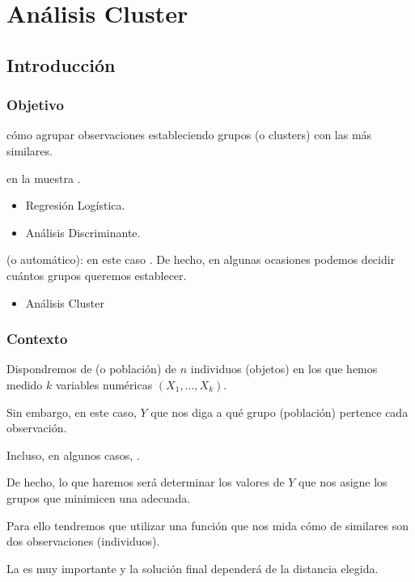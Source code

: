 \section{Análisis Cluster}
\subsection{Introducción}
\subsubsection{Objetivo}
 cómo agrupar observaciones estableciendo grupos (o clusters) con las más similares.

 en la muestra .
\begin{itemize}
\item Regresión Logística.
\item Análisis Discriminante.
\end{itemize}
 (o automático): en este caso . De hecho, en algunas ocasiones podemos decidir cuántos grupos queremos establecer.
\begin{itemize}
\item Análisis Cluster
\end{itemize}
\subsubsection{Contexto}
Dispondremos de  (o población) de $n$ individuos (objetos) en los que hemos medido $k$ variables numéricas $(X_1,\dots,X_k)$.

Sin embargo, en este caso,  $Y$ que nos diga a qué grupo (población) pertence cada observación.

Incluso, en algunos casos, .

De hecho, lo que haremos será determinar los valores de $Y$ que nos asigne los grupos que minimicen una  adecuada.

Para ello tendremos que utilizar una función  que nos mida cómo de similares son dos observaciones (individuos).

La  es muy importante y la solución final dependerá de la distancia elegida.

